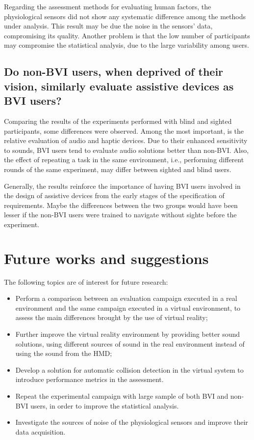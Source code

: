 Regarding the assessment methods for evaluating human factors, the physiological sensors did not show any systematic difference among the methods under analysis. This result may be due the noise in the sensors' data, compromising its quality. Another problem is that the low number of participants may compromise the statistical analysis, due to the large variability among users.

\subsection*{Do non-BVI users, when deprived of their vision, similarly evaluate assistive devices as BVI users?}

Comparing the results of the experiments performed with blind and sighted participants, some differences were observed. Among the most important, is the relative evaluation of audio and haptic devices. Due to their enhanced sensitivity to sounds, BVI users tend to evaluate audio solutions better than non-BVI. Also, the effect of repeating a task in the same environment, i.e., performing different rounds of the same experiment, may differ between sighted and blind users.

Generally, the results reinforce the importance of having BVI users involved in the design of assistive devices from the early stages of the specification of requirements. Maybe the differences between the two groups would have been lesser if the non-BVI users were trained to navigate without sighte before the experiment.


\section{Future works and suggestions}

The following topics are of interest for future research:

\begin{itemize}
    \item Perform a comparison between an evaluation campaign executed in a real environment and the same campaign executed in a virtual environment, to assess the main differences brought by the use of virtual reality;
    \item Further improve the virtual reality environment by providing better sound solutions, using different sources of sound in the real environment instead of using the sound from the HMD;
    \item Develop a solution for automatic collision detection in the virtual system to introduce performance metrics in the assessment.
    \item Repeat the experimental campaign with large sample of both BVI and non-BVI users, in order to improve the statistical analysis.
    \item Investigate the sources of noise of the physiological sensors and improve their data acquisition.
\end{itemize}